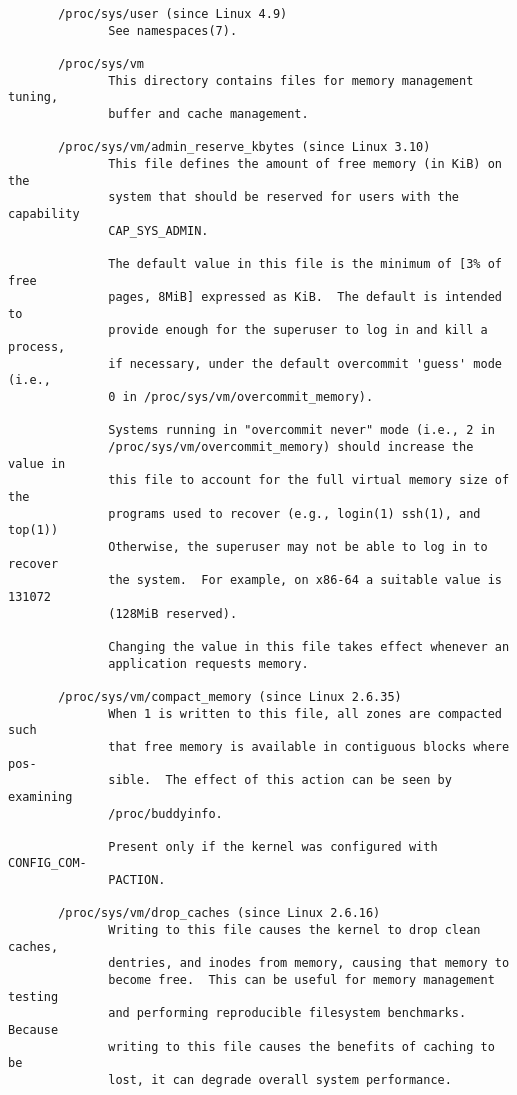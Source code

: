 \documentclass[]{article}
\begin{document}
\begin{verbatim}
       /proc/sys/user (since Linux 4.9)
              See namespaces(7).

       /proc/sys/vm
              This directory contains files for memory management tuning,
              buffer and cache management.

       /proc/sys/vm/admin_reserve_kbytes (since Linux 3.10)
              This file defines the amount of free memory (in KiB) on the
              system that should be reserved for users with the capability
              CAP_SYS_ADMIN.

              The default value in this file is the minimum of [3% of free
              pages, 8MiB] expressed as KiB.  The default is intended to
              provide enough for the superuser to log in and kill a process,
              if necessary, under the default overcommit 'guess' mode (i.e.,
              0 in /proc/sys/vm/overcommit_memory).

              Systems running in "overcommit never" mode (i.e., 2 in
              /proc/sys/vm/overcommit_memory) should increase the value in
              this file to account for the full virtual memory size of the
              programs used to recover (e.g., login(1) ssh(1), and top(1))
              Otherwise, the superuser may not be able to log in to recover
              the system.  For example, on x86-64 a suitable value is 131072
              (128MiB reserved).

              Changing the value in this file takes effect whenever an
              application requests memory.

       /proc/sys/vm/compact_memory (since Linux 2.6.35)
              When 1 is written to this file, all zones are compacted such
              that free memory is available in contiguous blocks where pos‐
              sible.  The effect of this action can be seen by examining
              /proc/buddyinfo.

              Present only if the kernel was configured with CONFIG_COM‐
              PACTION.

       /proc/sys/vm/drop_caches (since Linux 2.6.16)
              Writing to this file causes the kernel to drop clean caches,
              dentries, and inodes from memory, causing that memory to
              become free.  This can be useful for memory management testing
              and performing reproducible filesystem benchmarks.  Because
              writing to this file causes the benefits of caching to be
              lost, it can degrade overall system performance.


\end{verbatim}
\end{document}
